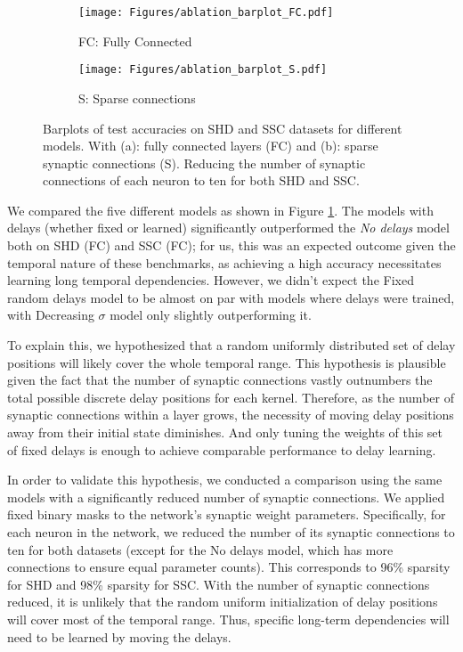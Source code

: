 \documentclass{article} \usepackage{iclr2024_conference,times}
\begin{document}
\begin{figure}[!ht]
  \centering
  \begin{subfigure}[b]{0.43\textwidth}
    \texttt{[image: Figures/ablation\_barplot\_FC.pdf]}
    \caption{FC: Fully Connected}
    \label{fig:fc}
  \end{subfigure}
\begin{subfigure}[b]{0.43\textwidth}
    \texttt{[image: Figures/ablation\_barplot\_S.pdf]}
    \caption{S: Sparse connections}
    \label{fig:S}
  \end{subfigure}
  \caption{Barplots of test accuracies on SHD and SSC datasets for different models. With (a): fully connected layers (FC) and (b): sparse synaptic connections (S). Reducing the number of synaptic connections of each neuron to ten for both SHD and SSC. }
  \label{fig:barplots}
\end{figure}

We compared the five different models as shown in Figure \ref{fig:fc}. The models with delays (whether fixed or learned) significantly outperformed the \textit{No delays} model both on SHD (FC) and SSC (FC); for us, this was an expected outcome given the temporal nature of these benchmarks, as achieving a high accuracy necessitates learning long temporal dependencies. However, we didn't expect the Fixed random delays model to be almost on par with models where delays were trained, with Decreasing $\sigma$ model only slightly outperforming it. 

To explain this, we hypothesized that a random uniformly distributed set of delay positions will likely cover the whole temporal range. This hypothesis is plausible given the fact that the number of synaptic connections vastly outnumbers the total possible discrete delay positions for each kernel. Therefore, as the number of synaptic connections within a layer grows, the necessity of moving delay positions away from their initial state diminishes. And only tuning the weights of this set of fixed delays is enough to achieve comparable performance to delay learning.

In order to validate this hypothesis, we conducted a comparison using the same models with a significantly reduced number of synaptic connections. We applied fixed binary masks to the network's synaptic weight parameters. Specifically, for each neuron in the network, we reduced the number of its synaptic connections to ten for both datasets (except for the No delays model, which has more connections to ensure equal parameter counts). This corresponds to 96\% sparsity for SHD and 98\% sparsity for SSC. 
With the number of synaptic connections reduced, it is unlikely that the random uniform initialization of delay positions will cover most of the temporal range. Thus, specific long-term dependencies will need to be learned by moving the delays. 
\end{document}

